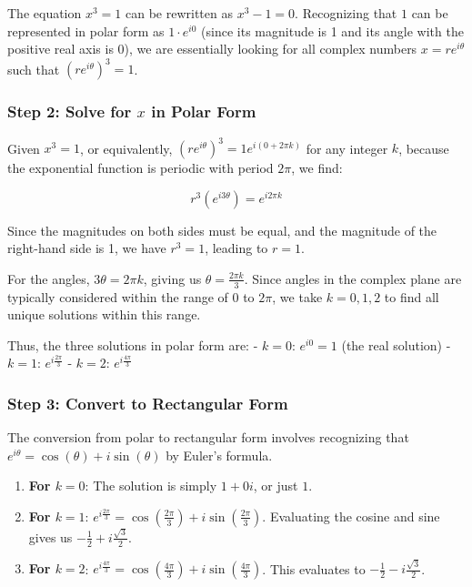 \documentclass[
]{article}
\begin{document}
The equation \(x^3 = 1\) can be rewritten as \(x^3 - 1 = 0\).
Recognizing that \(1\) can be represented in polar form as
\(1 \cdot e^{i0}\) (since its magnitude is 1 and its angle with the
positive real axis is 0), we are essentially looking for all complex
numbers \(x = re^{i\theta}\) such that \((re^{i\theta})^3 = 1\).

\subsubsection{\texorpdfstring{Step 2: Solve for \(x\) in Polar
Form}{Step 2: Solve for x in Polar Form}}\label{step-2-solve-for-x-in-polar-form}

Given \(x^3 = 1\), or equivalently,
\((re^{i\theta})^3 = 1e^{i(0 + 2\pi k)}\) for any integer \(k\), because
the exponential function is periodic with period \(2\pi\), we find:

\[r^3(e^{i3\theta}) = e^{i2\pi k}\]

Since the magnitudes on both sides must be equal, and the magnitude of
the right-hand side is 1, we have \(r^3 = 1\), leading to \(r = 1\).

For the angles, \(3\theta = 2\pi k\), giving us
\(\theta = \frac{2\pi k}{3}\). Since angles in the complex plane are
typically considered within the range of \(0\) to \(2\pi\), we take
\(k = 0, 1, 2\) to find all unique solutions within this range.

Thus, the three solutions in polar form are: - \(k = 0\): \(e^{i0} = 1\)
(the real solution) - \(k = 1\): \(e^{i\frac{2\pi}{3}}\) - \(k = 2\):
\(e^{i\frac{4\pi}{3}}\)

\subsubsection{Step 3: Convert to Rectangular
Form}\label{step-3-convert-to-rectangular-form}

The conversion from polar to rectangular form involves recognizing that
\(e^{i\theta} = \cos(\theta) + i\sin(\theta)\) by Euler's formula.

\begin{enumerate}
\def\labelenumi{\arabic{enumi}.}
\item
  \textbf{For \(k = 0\)}: The solution is simply \(1 + 0i\), or just
  \(1\).
\item
  \textbf{For \(k = 1\)}:
  \(e^{i\frac{2\pi}{3}} = \cos\left(\frac{2\pi}{3}\right) + i\sin\left(\frac{2\pi}{3}\right)\).
  Evaluating the cosine and sine gives us
  \(-\frac{1}{2} + i\frac{\sqrt{3}}{2}\).
\item
  \textbf{For \(k = 2\)}:
  \(e^{i\frac{4\pi}{3}} = \cos\left(\frac{4\pi}{3}\right) + i\sin\left(\frac{4\pi}{3}\right)\).
  This evaluates to \(-\frac{1}{2} - i\frac{\sqrt{3}}{2}\).
\end{enumerate}
\end{document}
